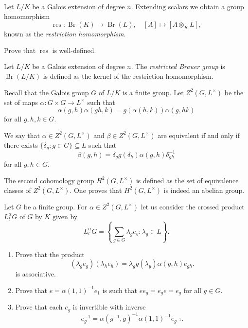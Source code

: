 
Let $L/K$ be a Galois extension of degree $n$.  
Extending scalars we obtain a group homomorphism
\[
    \operatorname{res}\colon\operatorname{Br}(K)\to\operatorname{Br}(L),\quad
    [A]\mapsto [A\otimes_KL],
\]
known as the \emph{restriction homomorphism}. 

\begin{exercise}
    Prove that $\operatorname{res}$ is well-defined.
\end{exercise}

\begin{definition}
    Let $L/K$ be a Galois extension of degree $n$. 
    The \emph{restricted Brauer group} is $\operatorname{Br}(L/K)$ is defined
    as the kernel of the restriction homomorphism. 
\end{definition}


Recall that the Galois group $G$ of $L/K$ is a finite group. Let 
$Z^2(G,L^{\times})$ be the set of maps $\alpha\colon G\times G\to L^{\times}$
such that 
\[
\alpha(g,h)\alpha(gh,k)=g(\alpha(h,k))\alpha(g,hk)
\]
for all $g,h,k\in G$. 

We say that 
$\alpha\in Z^2(G,L^{\times})$ and $\beta\in Z^2(G,L^{\times})$ 
are equivalent if and only if
there exists $\{\delta_g:g\in G\}\subseteq L$ such that 
\[
\beta(g,h)=\delta_gg(\delta_h)\alpha(g,h)\delta^{-1}_{gh}
\]
for all $g,h\in G$. 

The second cohomology group $H^2(G,L^{\times})$ is defined as the
set of equivalence classes of $Z^2(G,L^{\times})$. One proves that
$H^2(G,L^{\times})$ is indeed an abelian group. 

\begin{exercise}
Let $G$ be a finite group. 
For $\alpha\in Z^2(G,L^{\times})$ let us consider the 
crossed product $L_t^{\alpha}G$ of $G$ by $K$ 
given by 
\[
L_t^{\alpha}G=\left\{\sum_{g\in G}\lambda_ge_g:\lambda_g\in L\right\}.
\]
\begin{enumerate}
    \item Prove that the product 
\[
    (\lambda_ge_g)(\lambda_he_h)=\lambda_gg(\lambda_y)\alpha(g,h)e_{gh}.
\]
is associative. 
\item Prove that $e=\alpha(1,1)^{-1}e_1$ is such that 
$ee_g=e_ge=e_g$ for all $g\in G$. 
\item Prove that 
each $e_g$ is invertible with inverse 
\[
e_g^{-1}=\alpha(g^{-1},g)^{-1}\alpha(1,1)^{-1}e_{g^{-1}}.
\]
\end{enumerate}
\end{exercise}

